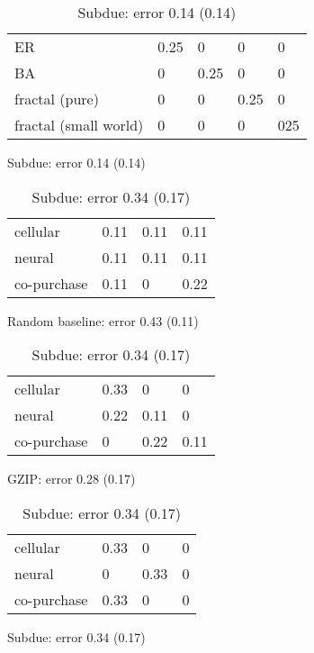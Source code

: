 \documentclass{article}
\begin{document}
\begin{table}
\begin{subfigure}[b]{1\columnwidth}
\begin{tabular}{l |  l l l l}
\hline
  ER                     & 0.25 & 0    & 0    & 0\\
  BA                     & 0    & 0.25 & 0    & 0\\
  fractal (pure)         & 0    & 0    & 0.25 & 0\\
  fractal (small world)  & 0    & 0    & 0    & 025\\
\hline
\end{tabular}
\caption{Subdue: error 0.14 (0.14)}
\end{subfigure}
\label{table:synthetic-large}
\end{table}

\begin{table}

\caption{Results for the experiment on natural datasets.}

\begin{subfigure}[b]{1\columnwidth}
\centering
\begin{tabular}{l | l l l }
\hline
  cellular      &  0.11 & 0.11 & 0.11 \\
  neural        &  0.11 & 0.11 & 0.11 \\
  co-purchase   &  0.11 & 0    & 0.22 \\
\hline
\end{tabular}
\caption{Random baseline: error 0.43 (0.11)}
\end{subfigure}
\vspace{3mm}

\begin{subfigure}[b]{1\columnwidth}
\centering
\begin{tabular}{l | l l l }
\hline
  cellular      & 0.33 & 0 & 0 \\
  neural        & 0.22 & 0.11 & 0 \\
  co-purchase   & 0    & 0.22 & 0.11 \\
\hline
\end{tabular}
\caption{GZIP: error 0.28 (0.17)}
\end{subfigure}
\vspace{3mm}

\begin{subfigure}[b]{1\columnwidth}
\centering
\begin{tabular}{l | l l l }
\hline
  cellular     & 0.33 & 0 & 0 \\
  neural       & 0    & 0.33 & 0 \\
  co-purchase  & 0.33 & 0 & 0 \\
\hline
\end{tabular}
\caption{Subdue: error 0.34 (0.17) }
\end{subfigure}
\label{table:real-life}
\end{table}
\end{document}
